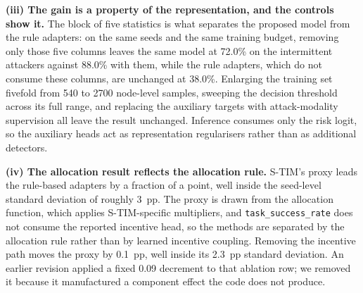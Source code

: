 \documentclass[notspecified,article,submit,moreauthors]{Definitions/mdpi}
\begin{document}
\begin{table}[!htbp]
  \centering
  \caption{On--off detection rate (\%) against duty cycle, 30 UAVs, 30\% malicious, 50 evaluation seeds. Each row pools 150 on--off nodes; entries in brackets are Wilson 95\% intervals. Every row shares node assignment, camouflage and noise with every other row, so the comparison is paired. The evaluated checkpoints were trained at a duty of 0.50.}
  \label{tab:duty_sweep}
  \footnotesize
  \setlength{\tabcolsep}{5pt}
  \renewcommand{\arraystretch}{1.15}
\end{table}

\textbf{(iii) The gain is a property of the representation, and the controls show it.} The block of five statistics is what separates the proposed model from the rule adapters: on the same seeds and the same training budget, removing only those five columns leaves the same model at 72.0\% on the intermittent attackers against 88.0\% with them, while the rule adapters, which do not consume these columns, are unchanged at 38.0\%. Enlarging the training set fivefold from 540 to 2700 node-level samples, sweeping the decision threshold across its full range, and replacing the auxiliary targets with attack-modality supervision all leave the result unchanged. Inference consumes only the risk logit, so the auxiliary heads act as representation regularisers rather than as additional detectors.

\textbf{(iv) The allocation result reflects the allocation rule.} S-TIM's proxy leads the rule-based adapters by a fraction of a point, well inside the seed-level standard deviation of roughly 3~pp. The proxy is drawn from the allocation function, which applies S-TIM-specific multipliers, and \texttt{task\_success\_rate} does not consume the reported incentive head, so the methods are separated by the allocation rule rather than by learned incentive coupling. Removing the incentive path moves the proxy by 0.1~pp, well inside its 2.3~pp standard deviation. An earlier revision applied a fixed 0.09 decrement to that ablation row; we removed it because it manufactured a component effect the code does not produce.
\end{document}
